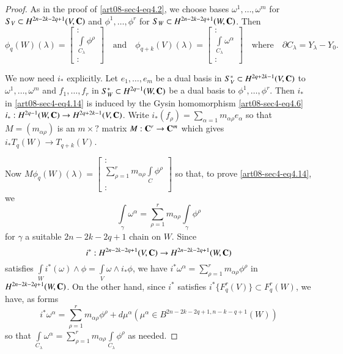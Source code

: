 \begin{proof}
As in the proof of \eqref{art08-sec4-eq4.2}, we choose bases $\omega^{1},\ldots,\omega^{m}$ for $S_{V}\subset H^{2n-2k-2q+1}(V,\mathbf{C})$ and $\phi^{1},\ldots,\phi^{r}$ for $S_{W}\subset H^{2n-2k-2q+1}(W,\mathbf{C})$. Then
$$
\phi_{q}(W)(\lambda)=
\begin{bmatrix}
:\\
\int\limits_{C_{\lambda}}\phi^{\rho}\\
:
\end{bmatrix}
\text{~~ and~~ } \phi_{q+k}(V)(\lambda)=
\begin{bmatrix}
:\\
\int\limits_{C_{\lambda}}\omega^{\alpha}\\
:
\end{bmatrix}
\text{~~ where~~ } \partial C_{\lambda}=Y_{\lambda}-Y_{0}.
$$

We now need $i_{*}$ explicitly. Let $e_{1},\ldots,e_{m}$ be a dual basis in $S^{*}_{V}\subset H^{2q+2k-1}(V,\mathbf{C})$ to $\omega^{1},\ldots,\omega^{m}$ and $f_{1},\ldots,f_{r}$ in $S^{*}_{W}\subset H^{2q-1}(W,\mathbf{C})$ be a dual basis to $\phi^{1},\ldots,\phi^{r}$. Then $i_{*}$ in \eqref{art08-sec4-eq4.14} is induced by the Gysin homomorphism \eqref{art08-sec4-eq4.6} $i_{*}:H^{2q-1}(W,\mathbf{C})\to H^{2q+2k-1}(V,\mathbf{C})$. Write $i_{*}(f_{\rho})=\sum\limits_{\alpha=1}m_{\alpha\rho}e_{\alpha}$ so that $M=(m_{\alpha\rho})$ is an $m\times ?$ matrix $M:\mathbf{C}^{r}\to \mathbf{C}^{m}$ which gives $i_{*}T_{q}(W)\to T_{q+k}(V)$.

Now $M\phi_{q}(W)(\lambda)=\left[\begin{smallmatrix}:\\ \sum\limits^{r}_{\rho=1}m_{\alpha\rho}\int\limits_{C}\phi^{\rho}\\ :\end{smallmatrix}\right]$ so that, to prove \eqref{art08-sec4-eq4.14}, we 
\begin{equation}
\int\limits_{\gamma}\omega^{\alpha}=\sum\limits^{r}_{\rho=1}m_{\alpha\rho}\int\limits_{\gamma}\phi^{\rho}\label{art08-sec4-eq4.15}
\end{equation}
for $\gamma$ a suitable $2n-2k-2q+1$ chain on $W$. Since
$$
i^{*}:H^{2n-2k-2q+1}(V,\mathbf{C})\to H^{2n-2k-2q+1}(W,\mathbf{C})
$$
satisfies $\int\limits_{W}i^{*}(\omega)\wedge \phi=\int\limits_{V}\omega \wedge i_{*}\phi$, we have $i^{*}\omega^{\alpha}=\sum\limits^{r}_{\rho=1}m_{\alpha\rho}\phi^{\rho}$ in $H^{2n-2k-2q+1}(W,\mathbf{C})$. On the other hand, since $i^{*}$ satisfies $i^{*}\{F^{r}_{q}(V)\}\subset F^{r}_{q}(W)$, we have, as forms 
$$
i^{*}\omega^{\alpha}=\sum\limits^{r}_{\rho=1}m_{\alpha\rho}\phi^{\rho}+d\mu^{\alpha}(\mu^{\alpha}\in B^{2n-2k-2q+1, n-k-q+1}(W))
$$ 
so that $\int\limits_{C_{\lambda}}\omega^{\alpha}=\sum\limits^{r}_{\rho=1}m_{\alpha\rho}\int\limits_{C_{\lambda}}\phi^{\rho}$ as needed.
\end{proof}

